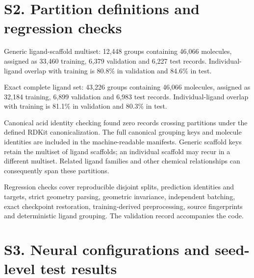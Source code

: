 \section*{S2. Partition definitions and regression checks}

Generic ligand-scaffold multiset: 12,448 groups containing 46,066 molecules, assigned as 33,460 training, 6,379 validation and 6,227 test records. Individual-ligand overlap with training is 80.8\% in validation and 84.6\% in test.

Exact complete ligand set: 43,226 groups containing 46,066 molecules, assigned as 32,184 training, 6,899 validation and 6,983 test records. Individual-ligand overlap with training is 81.1\% in validation and 80.3\% in test.

Canonical acid identity checking found zero records crossing partitions under the defined RDKit canonicalization. The full canonical grouping keys and molecule identities are included in the machine-readable manifests. Generic scaffold keys retain the multiset of ligand scaffolds; an individual scaffold may recur in a different multiset. Related ligand families and other chemical relationships can consequently span these partitions.

Regression checks cover reproducible disjoint splits, prediction identities and targets, strict geometry parsing, geometric invariance, independent batching, exact checkpoint restoration, training-derived preprocessing, source fingerprints and deterministic ligand grouping. The validation record accompanies the code.

\section*{S3. Neural configurations and seed-level test results}

